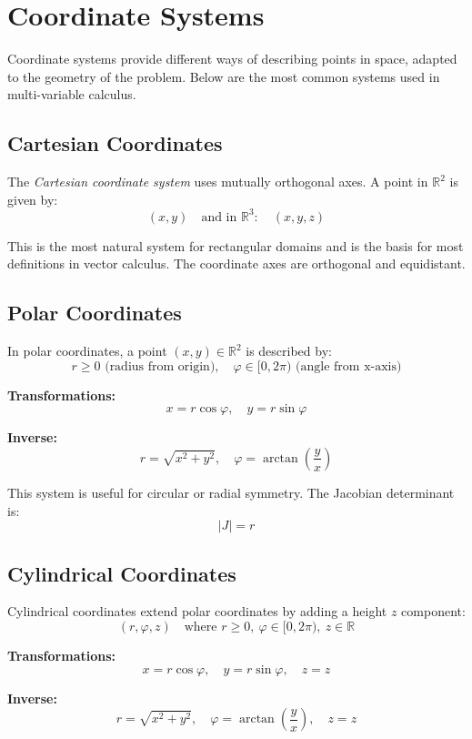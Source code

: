 \newpage
\section{Coordinate Systems}

Coordinate systems provide different ways of describing points in space, adapted to the geometry of the problem. Below are the most 
common systems used in multi-variable calculus.

\subsection{Cartesian Coordinates}

The \emph{Cartesian coordinate system} uses mutually orthogonal axes. A point in \( \mathbb{R}^2 \) is given by:
\[
(x, y)
\quad \text{and in } \mathbb{R}^3: \quad (x, y, z)
\]

This is the most natural system for rectangular domains and is the basis for most definitions in vector calculus. The coordinate axes are orthogonal and equidistant.


\subsection{Polar Coordinates}

In polar coordinates, a point \( (x, y) \in \mathbb{R}^2 \) is described by:
\[
r \ge 0 \text{ (radius from origin)}, \quad \varphi \in [0, 2\pi) \text{ (angle from x-axis)}
\]

\textbf{Transformations:}
\[
x = r \cos \varphi, \quad y = r \sin \varphi
\]

\textbf{Inverse:}
\[
r = \sqrt{x^2 + y^2}, \quad \varphi = \arctan\left(\frac{y}{x}\right)
\]

This system is useful for circular or radial symmetry. The Jacobian determinant is:
\[
|J| = r
\]

\subsection{Cylindrical Coordinates}

Cylindrical coordinates extend polar coordinates by adding a height \( z \) component:
\[
(r, \varphi, z) \quad \text{where } r \ge 0, \ \varphi \in [0, 2\pi), \ z \in \mathbb{R}
\]

\textbf{Transformations:}
\[
x = r \cos \varphi, \quad y = r \sin \varphi, \quad z = z
\]

\textbf{Inverse:}
\[
r = \sqrt{x^2 + y^2}, \quad \varphi = \arctan\left(\frac{y}{x}\right), \quad z = z
\]


